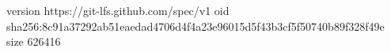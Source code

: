 version https://git-lfs.github.com/spec/v1
oid sha256:8c91a37292ab51eaedad4706d4f4a23e96015d5f43b3cf5f50740b89f328f49e
size 626416
